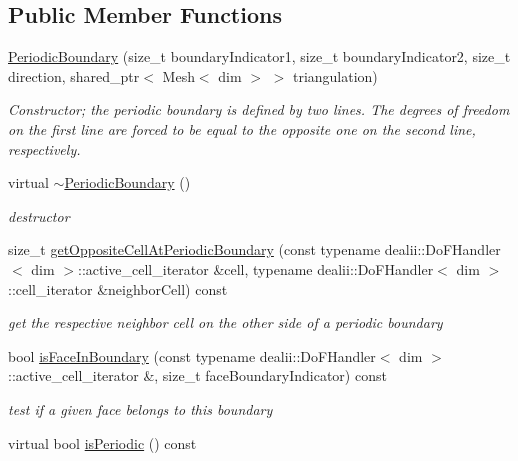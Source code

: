 \subsection*{Public Member Functions}
\begin{DoxyCompactItemize}
\item 
\hyperlink{classnatrium_1_1PeriodicBoundary_acafd6408c0c450dc2ce657a919aae545}{PeriodicBoundary} (size\_\-t boundaryIndicator1, size\_\-t boundaryIndicator2, size\_\-t direction, shared\_\-ptr$<$ Mesh$<$ dim $>$ $>$ triangulation)
\begin{DoxyCompactList}\small\item\em Constructor; the periodic boundary is defined by two lines. The degrees of freedom on the first line are forced to be equal to the opposite one on the second line, respectively. \item\end{DoxyCompactList}\item 
\hypertarget{classnatrium_1_1PeriodicBoundary_ae71c1a8ea1f1f9e29be8ab6496125a5c}{
virtual \hyperlink{classnatrium_1_1PeriodicBoundary_ae71c1a8ea1f1f9e29be8ab6496125a5c}{$\sim$PeriodicBoundary} ()}
\label{classnatrium_1_1PeriodicBoundary_ae71c1a8ea1f1f9e29be8ab6496125a5c}

\begin{DoxyCompactList}\small\item\em destructor \item\end{DoxyCompactList}\item 
size\_\-t \hyperlink{classnatrium_1_1PeriodicBoundary_aaa861135e070feb4b3dd4408c487cd14}{getOppositeCellAtPeriodicBoundary} (const typename dealii::DoFHandler$<$ dim $>$::active\_\-cell\_\-iterator \&cell, typename dealii::DoFHandler$<$ dim $>$::cell\_\-iterator \&neighborCell) const 
\begin{DoxyCompactList}\small\item\em get the respective neighbor cell on the other side of a periodic boundary \item\end{DoxyCompactList}\item 
bool \hyperlink{classnatrium_1_1PeriodicBoundary_af43c1306653cc8a9d5aea68edcfca370}{isFaceInBoundary} (const typename dealii::DoFHandler$<$ dim $>$::active\_\-cell\_\-iterator \&, size\_\-t faceBoundaryIndicator) const 
\begin{DoxyCompactList}\small\item\em test if a given face belongs to this boundary \item\end{DoxyCompactList}\item 
\hypertarget{classnatrium_1_1PeriodicBoundary_a38c5e966e4b2a1ee185a5634fc379393}{
virtual bool \hyperlink{classnatrium_1_1PeriodicBoundary_a38c5e966e4b2a1ee185a5634fc379393}{isPeriodic} () const }
\label{classnatrium_1_1PeriodicBoundary_a38c5e966e4b2a1ee185a5634fc379393}


\end{DoxyCompactItemize}
